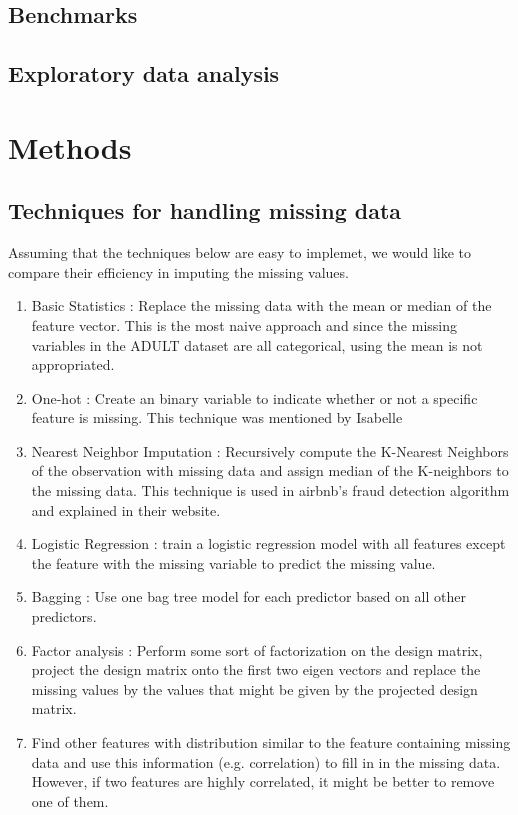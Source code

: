 \documentclass[12pt]{article}
\begin{document}
\subsection{Benchmarks}

\subsection{Exploratory data analysis}

\section{Methods}


\subsection{Techniques for handling missing data}
Assuming that the techniques below are easy to implemet, we would like to compare their efficiency in imputing the missing values.

\begin{enumerate}
\item Basic Statistics : Replace the missing data with the mean or median of the feature vector. This is the most naive approach and since the missing variables in the ADULT dataset are all categorical, using the mean is not appropriated.
\item One-hot : Create an binary variable to indicate whether or not a specific feature is missing. This technique was mentioned by Isabelle
\item Nearest Neighbor Imputation : Recursively compute the K-Nearest Neighbors of the observation with missing data and assign median of the K-neighbors to the missing data. This technique is used in airbnb's fraud detection algorithm and explained in their website.
\item Logistic Regression : train a logistic regression model with all features except the feature with the missing variable to predict the missing value.
\item Bagging : Use one bag tree model for each predictor based on all other
   predictors.
\item Factor analysis : Perform some sort of factorization on the design matrix, project the design matrix onto the first two eigen vectors and replace the missing values by the values that might be given by the projected design matrix.
\item Find other features with distribution similar to the feature containing missing data and use this information (e.g. correlation) to fill in in the missing data. However, if two features are highly correlated, it might be better to remove one of them.
\end{enumerate}
\end{document}
